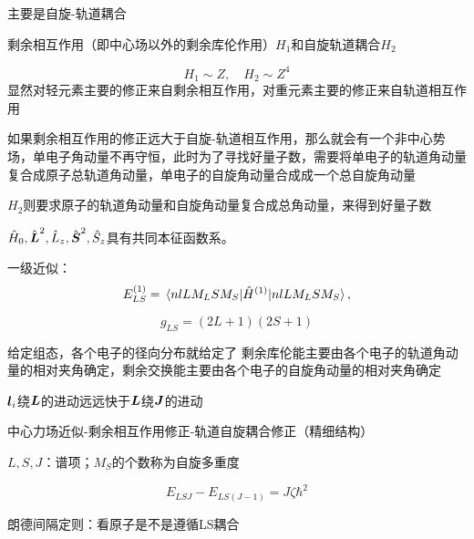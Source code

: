 \documentclass[UTF8, a4paper]{ctexart}
\begin{document}
主要是自旋-轨道耦合

剩余相互作用（即中心场以外的剩余库伦作用）$H_1$和自旋轨道耦合$H_2$

\[
    H_1 \sim Z, \quad H_2 \sim Z^4
\]
显然对轻元素主要的修正来自剩余相互作用，对重元素主要的修正来自轨道相互作用

如果剩余相互作用的修正远大于自旋-轨道相互作用，那么就会有一个非中心势场，单电子角动量不再守恒，此时为了寻找好量子数，需要将单电子的轨道角动量复合成原子总轨道角动量，单电子的自旋角动量合成成一个总自旋角动量

$H_2$则要求原子的轨道角动量和自旋角动量复合成总角动量，来得到好量子数

$\hat{H}_0, \hat{\vb*{L}}^2, \hat{L}_z, \hat{\vb*{S}}^2, \hat{S}_z$具有共同本征函数系。

一级近似：
\[
    E^{(1)}_{LS} = \mel{n l L M_L S M_S}{\hat{H}^{(1)}}{n l L M_L S M_S},
\]

\[
    g_{LS} = (2L+1)(2S+1)
\]

给定组态，各个电子的径向分布就给定了
剩余库伦能主要由各个电子的轨道角动量的相对夹角确定，剩余交换能主要由各个电子的自旋角动量的相对夹角确定

$\vb*{l}_i$绕$\vb*{L}$的进动远远快于$\vb*{L}$绕$\vb*{J}$的进动

中心力场近似-剩余相互作用修正-轨道自旋耦合修正（精细结构）

$L, S, J$：谱项；$M_S$的个数称为自旋多重度

\[
    E_{LSJ} - E_{LS(J-1)} = J \zeta \hbar^2
\]

朗德间隔定则：看原子是不是遵循LS耦合
\end{document}
